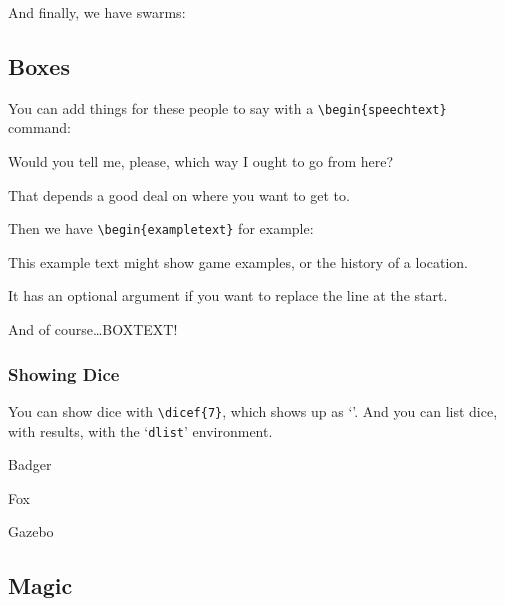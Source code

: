 \documentclass[a4paper,openany]{book}
\begin{document}
\begin{multicols}{2}
\togglefalse{genExamples}


\humansoldier

And finally, we have swarms:


\subsection{Boxes}

You can add things for these people to say with a \verb"\begin{speechtext}" command:

\begin{speechtext}

  Would you tell me, please, which way I ought to go from here?

  That depends a good deal on where you want to get to.

\end{speechtext}

Then we have \verb"\begin{exampletext}" for example:

\begin{exampletext}
  This example text might show game examples, or the history of a location.

  It has an optional argument if you want to replace the line at the start.

\end{exampletext}

\begin{boxtext}
  And of course\ldots BOXTEXT!

\end{boxtext}

\subsubsection{Showing Dice}

You can show dice with \verb"\dicef{7}", which shows up as `'.
And you can list dice, with results, with the `\texttt{dlist}' environment.

\begin{dlist}
  \item Badger
  \item Fox
  \item Gazebo
\end{dlist}

\subsection{Magic}


\end{multicols}
\end{document}
